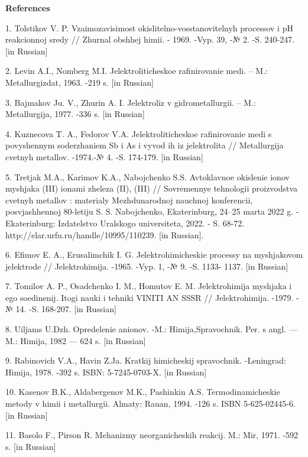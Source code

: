 {\bfseries References}

1. Tolstikov V. P. Vzaimozavisimost\textquotesingle{}
okislitel\textquotesingle no-vosstanovitel\textquotesingle nyh processov
i pH reakcionnoj sredy // Zhurnal obshhej himii. - 1969. -Vyp. 39, -№ 2.
-S. 240-247. {[}in Russian{]}

2. Levin A.I., Nomberg M.I. Jelektroliticheskoe rafinirovanie medi. --
M.: Metallurgizdat, 1963. -219 s. {[}in Russian{]}

3. Bajmakov Ju. V., Zhurin A. I. Jelektroliz v gidrometallurgii. -- M.:
Metallurgija, 1977. -336 s. {[}in Russian{]}

4. Kuznecova T. A., Fedorov V.A. Jelektroliticheskoe rafinirovanie medi
s povyshennym soderzhaniem Sb i As i vyvod ih iz jelektrolita //
Metallurgija cvetnyh metallov. -1974.-№ 4. -S. 174-179. {[}in Russian{]}

5. Tret\textquotesingle jak M.A., Karimov K.A., Nabojchenko S.S.
Avtoklavnoe okislenie ionov mysh\textquotesingle jaka (III) ionami
zheleza (II), (III) // Sovremennye tehnologii proizvodstva cvetnyh
metallov : materialy Mezhdunarodnoj nauchnoj konferencii, posvjashhennoj
80-letiju S. S. Nabojchenko, Ekaterinburg, 24--25 marta 2022 g. -
Ekaterinburg: Izdatel\textquotesingle stvo Ural\textquotesingle skogo
universiteta, 2022. - S. 68-72. http://elar.urfu.ru/handle/10995/110239.
{[}in Russian{]}.

6. Efimov E. A., Erusalimchik I. G. Jelektrohimicheskie processy na
mysh\textquotesingle jakovom jelektrode // Jelektrohimija. -1965. -Vyp.
1, -№ 9. -S. 1133- 1137. {[}in Russian{]}

7. Tomilov A. P., Osadchenko I. M., Homutov E. M. Jelektrohimija
mysh\textquotesingle jaka i ego soedinenij. Itogi nauki i tehniki VINITI
AN SSSR // Jelektrohimija. -1979. -№ 14. -S. 168-207. {[}in Russian{]}

8. Uil\textquotesingle jams U.Dzh. Opredelenie anionov. -M.:
Himija,Spravochnik. Per. s angl. --- M.: Himija, 1982 --- 624 s. {[}in
Russian{]}

9. Rabinovich V.A., Havin Z.Ja. Kratkij himicheskij spravochnik.
-Leningrad: Himija, 1978. -392 s. ISBN: 5-7245-0703-X. {[}in Russian{]}

10. Kasenov B.K., Aldabergenov M.K., Pashinkin A.S. Termodinamicheskie
metody v himii i metallurgii. Almaty: Rauan, 1994. -126 s. ISBN
5-625-02445-6. {[}in Russian{]}

11. Basolo F., Pirson R. Mehanizmy neorganicheskih reakcij. M.: Mir,
1971. -592 s. {[}in Russian{]}

